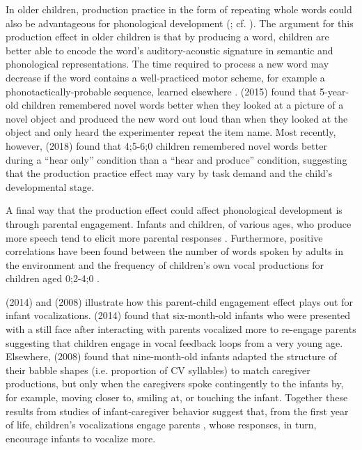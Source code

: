 \documentclass[a4paper,man,natbib,donotrepeattitle, apacite]{apa6}
\begin{document}
In older children, production practice in the form of repeating whole words could also be advantageous for phonological development (; cf. ). The argument for this production effect in older children is that by producing a word, children are better able to encode the word’s auditory-acoustic signature in semantic and phonological representations. The time required to process a new word may decrease if the word contains a well-practiced motor scheme, for example a phonotactically-probable sequence, learned elsewhere \cite{storkelInfluencePartwordPhonotactic2011,storkelComparisonHomonymNovel2005}. \citeauthor{ichtProductionEffectMemory2015} (2015) found that 5-year-old children remembered novel words better when they looked at a picture of a novel object and produced the new word out loud than when they looked at the object and only heard the experimenter repeat the item name. Most recently, however, \citeauthor{zamunerReverseProductionEffect2018} (2018) found that 4;5-6;0 children remembered novel words better during a ``hear only'' condition than a ``hear and produce'' condition, suggesting that the production practice effect may vary by task demand and the child’s developmental stage. 

A final way that the production effect could affect phonological development is through parental engagement. Infants and children, of various ages, who produce more speech tend to elicit more parental responses \cite{franklinEffectsParentalInteraction2014,goldsteinSocialFeedbackInfants2008,mcgillionWhatPavesWay2017,pretzerInfantadultVocalInteraction2019,warlaumontSocialFeedbackLoop2014}. Furthermore, positive correlations have been found between the number of words spoken by adults in the environment and the frequency of children’s own vocal productions for children aged 0;2-4;0 \cite{gilkersonImpactAdultTalk2009,orenaReliabilityLanguageEnvironment2019,weislederTalkingChildrenMatters2013}. 

\citeauthor{franklinEffectsParentalInteraction2014} (2014) and \citeauthor{goldsteinSocialFeedbackInfants2008} (2008) illustrate how this parent-child engagement effect plays out for infant vocalizations. \citeauthor{franklinEffectsParentalInteraction2014} (2014) found that six-month-old infants who were presented with a still face after interacting with parents vocalized more to re-engage parents suggesting that children engage in vocal feedback loops from a very young age. Elsewhere, \citeauthor{goldsteinSocialFeedbackInfants2008} (2008) found that nine-month-old infants adapted the structure of their babble shapes (i.e. proportion of CV syllables) to match caregiver productions, but only when the caregivers spoke contingently to the infants by, for example, moving closer to, smiling at, or touching the infant. Together these results from studies of infant-caregiver behavior suggest that, from the first year of life, children’s vocalizations engage parents  \cite{albertSocialFunctionsBabbling2018}, whose responses, in turn, encourage infants to vocalize more. 
\end{document}
